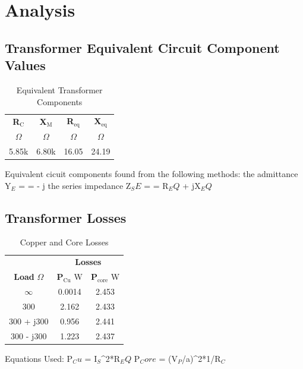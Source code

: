 \documentclass{article}
\begin{document}
\section{Analysis}
\subsection{Transformer Equivalent Circuit Component Values}
\begin{table}[H]
  \centering
  \begin{tabular}{*{4}{c}}
    \textbf{R$_\text{C}$} & \textbf{X$_\text{M}$}
    & \textbf{R$_{\text{eq}}$} & \textbf{X$_{\text{eq}}$} \\
    $\Omega$ & $\Omega$ &$\Omega$ & $\Omega$ \\
    \hline
    5.85k & 6.80k & 16.05 & 24.19 \\
  \end{tabular}
  \caption{Equivalent Transformer Components}
  \label{tab:equiv_comp}
\end{table}

Equivalent cicuit components found from the following methods:
the admittance Y$_E$ = \angle{-\theta} =  - j
the series impedance Z$_SE$ = \angle{\theta} = R$_EQ$ + jX$_EQ$

\subsection{Transformer Losses}
\begin{table}[H]
  \centering
  \begin{tabular}{*{3}{c}}
    & \multicolumn{2}{c}{\textbf{Losses}} \\
    \textbf{Load} $\Omega$ & \textbf{P$_\text{Cu}$} W & \textbf{P$_\text{core}$} W \\
    \hline
    $\infty$ & 0.0014 & 2.453 \\
    300 & 2.162 & 2.433 \\
    300 + j300 & 0.956 & 2.441 \\
    300 - j300 & 1.223 & 2.437 \\
  \end{tabular}
  \caption{Copper and Core Losses}
  \label{tab:power_losses}
\end{table}

Equations Used:
P$_Cu$ = I$_S$^2*R$_EQ$
P$_Core$ = (V$_P$/a)^2*1/R$_C$
\end{document}
